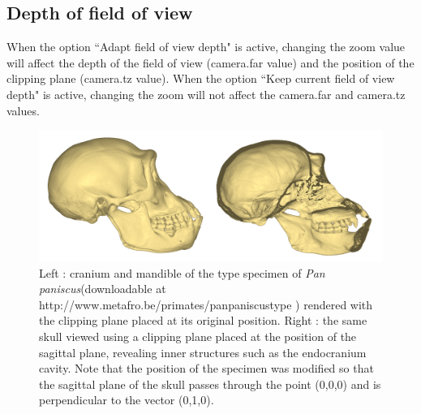 \subsection{Depth of field of view}
When the option ``Adapt field of view depth" is active, changing the zoom value will affect the depth of the field of view (camera.far value) and the position of the clipping plane (camera.tz value). When the option ``Keep current field of view depth" is active, changing the zoom will not affect the camera.far and camera.tz values.\\


\begin{figure}[t] 
  \centering
  \includegraphics[scale=0.25]{images/Examples/Clipping_plane.png} 
	\caption{Left : cranium and mandible of the type specimen of \textit{Pan paniscus}(downloadable at http://www.metafro.be/primates/panpaniscustype ) rendered with the clipping plane placed at its original position. Right : the same skull viewed using a clipping plane placed at the position of the sagittal plane, revealing inner structures such as the endocranium cavity. Note that the position of the specimen was modified so that the sagittal plane of the skull passes  through the point (0,0,0) and is perpendicular to the vector (0,1,0).}
 
\end{figure}


